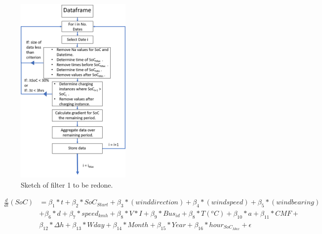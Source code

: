 \documentclass{article}
\begin{document}
\begin{figure}[ht]
    \centering
    \includegraphics[width = 0.5\textwidth]{Filter_1_powerpoint.png}
    \caption{Sketch of filter 1 to be redone.}
    \label{fig:3}
\end{figure}


\begin{equation}
\begin{split}
\frac{d}{dt}(SoC)  & = \beta_1*t + \beta_2*SoC_{Start} + \beta_3*(wind direction) + \beta_{4}*(wind speed) + \beta_{5}*(wind bearing) \\ 
& + \beta_{6}*d + \beta_{7}* speed_{kmh} + \beta_{8}*V*I + \beta_{9}*Bus_{id} +         \beta_{8}*T(^oC) + \beta_{10}*a + \beta_{11}*CMF + \\ 
& \beta_{12}*\Delta h + \beta_{13}*Wday + \beta_{14}*Month + \beta_{15}*Year + \beta_{16}*hour_{SoC_{Max}} + \epsilon 
\label{eq:7}
\end{split}
\end{equation}
\end{document}
